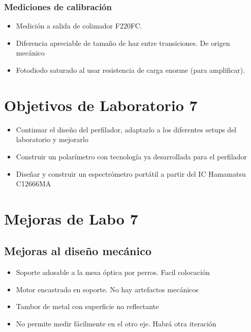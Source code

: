 \documentclass{article}
\begin{document}
    \subsubsection{Mediciones de calibración}

               \begin{itemize}
                    \item Medición a salida de colimador F220FC.
                    \item Diferencia apreciable de tamaño de haz entre transiciones. De origen mecánico
                    \item Fotodiodo saturado al usar resistencia de carga enorme (para amplificar).
                \end{itemize}
     
               

\section{Objetivos de Laboratorio 7}

    \begin{itemize}
     \item Continuar el diseño del perfilador, adaptarlo a los diferentes setups del laboratorio y mejorarlo
     \item Construir un polarímetro con tecnología ya desarrollada para el perfilador
     \item Diseñar y construir un espectrómetro portátil a partir del IC Hamamatsu C12666MA
     \end{itemize}



\section{Mejoras de Labo 7}

    \subsection{Mejoras al diseño mecánico}

        \begin{itemize}
            \item Soporte adosable a la mesa óptica por perros. Facil colocación
            \item Motor encastrado en soporte. No hay artefactos mecánicos
            \item Tambor de metal con superficie no reflectante
            \item No permite medir fácilmente en el otro eje. Habrá otra iteración
        \end{itemize}
\end{document}
